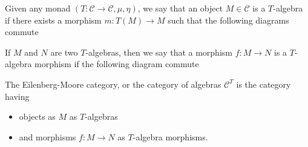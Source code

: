 \documentclass[../thesis.tex]{subfiles}
\begin{document}
        Given any monad $(T : \mathcal{C} \rightarrow \mathcal{C}, \mu, \eta)$, we say that an object $M \in \mathcal{C}$ is a $T$-algebra if there exists a morphism $m : T(M) \rightarrow M$ such that the following diagrams commute
        \begin{center}
        \end{center}

        If $M$ and $N$ are two $T$-algebras, then we say that a morphism $f : M \rightarrow N$ is a $T$-algebra morphism if the following diagram commute
        \begin{center}
        \end{center}
        \begin{definition}
            The Eilenberg-Moore category, or the category of algebras $\mathcal{C}^T$ is the category having
            \begin{itemize}
                \item objects as $M$ as $T$-algebras
                \item and morphisms $f : M \rightarrow N$ as $T$-algebra morphisms.
            \end{itemize}
        \end{definition}
        
\end{document}
